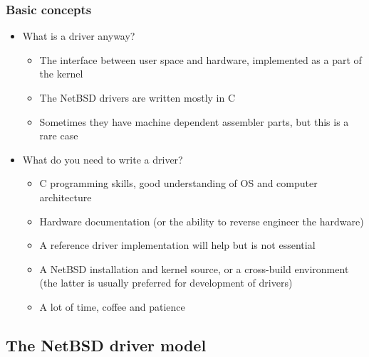 \documentclass[dvipsnames,table]{beamer}
\begin{document}
\begin{frame}
\frametitle{Basic concepts}
\begin{itemize}
	\item What is a driver anyway?
	\begin{itemize}
		\item The interface between user space and hardware, implemented as a part of the kernel
		\item The NetBSD drivers are written mostly in C
		\item Sometimes they have machine dependent assembler parts, but this is a rare case
	\end{itemize}
	\item What do you need to write a driver?
	\begin{itemize}
		\item C programming skills, good understanding of OS and computer architecture
		\item Hardware documentation (or the ability to reverse engineer the hardware)
		\item A reference driver implementation will help but is not essential
		\item A NetBSD installation and kernel source, or a cross-build environment (the latter is usually preferred for development of drivers)
		\item A lot of time, coffee and patience {\Large \smiley}

	\end{itemize}
\end{itemize}
\end{frame}

\subsection{The NetBSD driver model}
\end{document}
